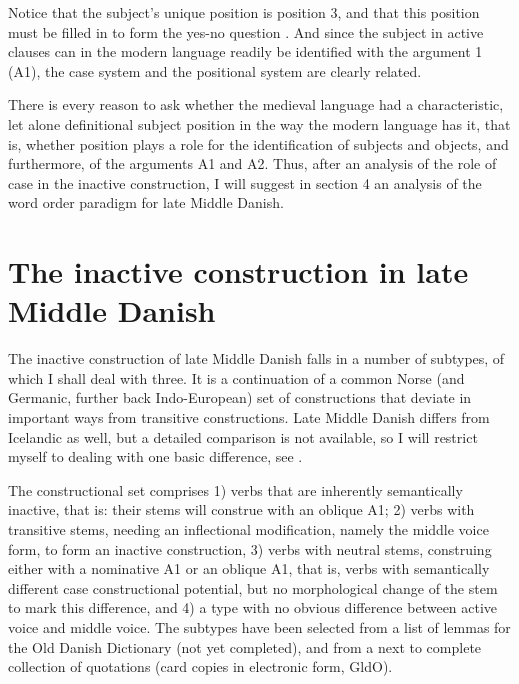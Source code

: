 \documentclass[output=paper]{langscibook}
\begin{document}
Notice that the subject's unique position is position 3, and that this position must be filled in to form the yes-no question . And since the subject in active clauses can in the modern language readily be identified with the argument 1 (A1), the case system and the positional system are clearly related.

There is every reason to ask whether the medieval language had a characteristic, let alone definitional subject position in the way the modern language has it, that is, whether position plays a role for the identification of subjects and objects, and furthermore, of the arguments A1 and A2. Thus, after an analysis of the role of case in the inactive construction, I will suggest in section 4 an analysis of the word order paradigm for late Middle Danish.

\section{The inactive construction in late Middle Danish} \label{heltoft:2}

The inactive construction of late Middle Danish falls in a number of subtypes, of which I shall deal with three. It is a continuation of a common Norse (and Germanic, further back Indo-European) set of constructions that deviate in important ways from transitive constructions. Late Middle Danish differs from Icelandic as well, but a detailed comparison is not available, so I will restrict myself to dealing with one basic difference, see .

The constructional set comprises 1) verbs that are inherently semantically inactive, that is: their stems will construe with an oblique A1; 2) verbs with transitive stems, needing an inflectional modification, namely the middle voice form, to form an inactive construction, 3) verbs with neutral stems, construing either with a nominative A1 or an oblique A1, that is, verbs with semantically different case constructional potential, but no morphological change of the stem to mark this difference, and 4) a type with no obvious difference between active voice and middle voice. The subtypes have been selected from a list of lemmas \citep{Bom1954} for the Old Danish Dictionary (not yet completed), and from a next to complete collection of quotations (card copies in electronic form, GldO). 
\end{document}
